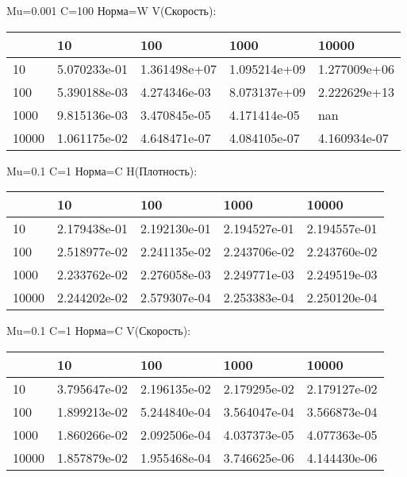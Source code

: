 \documentclass[a4paper, 12pt]{article}
\begin{document}
\bigskip
\bigskip
\bigskip


Mu=0.001  C=100 Норма=W V(Скорость):


\begin{tabular}{lllll}
\toprule
{} &         10    &         100   &         1000  &         10000 \\
\midrule
10    &  5.070233e-01 &  1.361498e+07 &  1.095214e+09 &  1.277009e+06 \\
100   &  5.390188e-03 &  4.274346e-03 &  8.073137e+09 &  2.222629e+13 \\
1000  &  9.815136e-03 &  3.470845e-05 &  4.171414e-05 &           nan \\
10000 &  1.061175e-02 &  4.648471e-07 &  4.084105e-07 &  4.160934e-07 \\
\bottomrule
\end{tabular}



\bigskip
\bigskip
\bigskip


Mu=0.1  C=1 Норма=C H(Плотность):


\begin{tabular}{lllll}
\toprule
{} &         10    &         100   &         1000  &         10000 \\
\midrule
10    &  2.179438e-01 &  2.192130e-01 &  2.194527e-01 &  2.194557e-01 \\
100   &  2.518977e-02 &  2.241135e-02 &  2.243706e-02 &  2.243760e-02 \\
1000  &  2.233762e-02 &  2.276058e-03 &  2.249771e-03 &  2.249519e-03 \\
10000 &  2.244202e-02 &  2.579307e-04 &  2.253383e-04 &  2.250120e-04 \\
\bottomrule
\end{tabular}



\bigskip
\bigskip
\bigskip


Mu=0.1  C=1 Норма=C V(Скорость):


\begin{tabular}{lllll}
\toprule
{} &         10    &         100   &         1000  &         10000 \\
\midrule
10    &  3.795647e-02 &  2.196135e-02 &  2.179295e-02 &  2.179127e-02 \\
100   &  1.899213e-02 &  5.244840e-04 &  3.564047e-04 &  3.566873e-04 \\
1000  &  1.860266e-02 &  2.092506e-04 &  4.037373e-05 &  4.077363e-05 \\
10000 &  1.857879e-02 &  1.955468e-04 &  3.746625e-06 &  4.144430e-06 \\
\bottomrule
\end{tabular}
\end{document}
